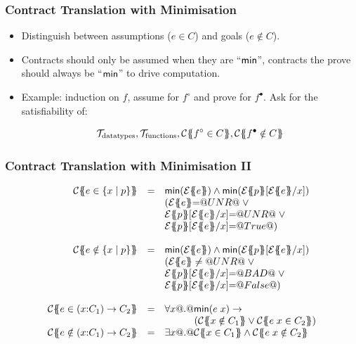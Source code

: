 \documentclass[serif,professionalfont]{beamer}
\begin{document}
\begin{frame}[fragile]
  \frametitle{Contract Translation with Minimisation}

  \begin{itemize}
    \item Distinguish between assumptions ($e \in C$) and goals ($e
      \notin C$).

    \item Contracts should only be assumed when they are ``$\mathsf{min}$'',
      contracts the prove should always be ``$\mathsf{min}$'' to drive
      computation.

    \item Example: induction on $f$, assume for $f^\circ$ and prove
      for $f^\bullet$. Ask for the satisfiability of:

      $$
        \mathcal{T}_{\text{datatypes}}, \mathcal{T}_{\text{functions}} ,
        \trc{f^\circ \in C},
        \trc{f^\bullet \notin C}
      $$
  \end{itemize}
\end{frame}

\begin{frame}[fragile]
  \frametitle{Contract Translation with Minimisation II}

  \[\begin{array}{rcl}
  \trc{e \in \{x \mid p \}}
    & = &      \Min(\etrans{}{}{e}) \land \Min(\etrans{}{}{p}[\etrans{}{}{e}/x]) \\
    &   &      (\etrans{}{}{e} {=} \unr \; \lor \; \\
    &   &      \etrans{}{}{p}[\etrans{}{}{e}/x] {=} \unr \; \lor \; \\
    &   &      \etrans{}{}{p}[\etrans{}{}{e}/x] {=} \True)
  \\ \\
  \trc{e \notin \{x \mid p \}}
    & = &      \Min(\etrans{}{}{e}) \land \Min(\etrans{}{}{p}[\etrans{}{}{e}/x]) \\
    &   &      (\etrans{}{}{e} \neq \unr \; \lor \; \\
    &   &      \etrans{}{}{p}[\etrans{}{}{e}/x] {=} \bad \; \lor \; \\
    &   &      \etrans{}{}{p}[\etrans{}{}{e}/x] {=} \False)
  \\ \\
  \trc{e \in (x{:}C_1) \to C_2}
    & = & \forall x @.@  \Min(e\;x) \to \\
    &   & \qquad\quad (\trc{x \notin C_1} \lor \trc{e\;x \in C_2}) \\
  \trc{e \notin (x{:}C_1) \to C_2}
    & = & \exists x @.@  \trc{x \in C_1} \land \trc{e\;x \notin C_2}
  \end{array}\]


\end{frame}
\end{document}
